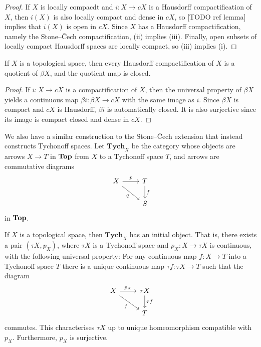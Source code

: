 \documentclass[article, a4paper, 11pt, oneside]{memoir}
\numberwithin{equation}{chapter}
\begin{document}
\begin{proof}
    If $X$ is locally compacdt and $i \colon X \to cX$ is a Hausdorff compactification of $X$, then $i(X)$ is also locally compact and dense in $cX$, so [TODO ref lemma] implies that $i(X)$ is open in $cX$. Since $X$ has a Hausdorff compactification, namely the Stone--\v{C}ech compactification, (ii) implies (iii). Finally, open subsets of locally compact Hausdorff spaces are locally compact, so (iii) implies (i).
\end{proof}


\begin{proposition}
    If $X$ is a topological space, then every Hausdorff compactification of $X$ is a quotient of $\beta X$, and the quotient map is closed.
\end{proposition}

\begin{proof}
    If $i \colon X \to cX$ is a compactification of $X$, then the universal property of $\beta X$ yields a continuous map $\beta i \colon \beta X \to cX$ with the same image as $i$. Since $\beta X$ is compact and $cX$ is Hausdorff, $\beta i$ is automatically closed. It is also surjective since its image is compact closed and dense in $cX$.
\end{proof}


\newcommand{\catTych}{\mathbf{Tych}}

We also have a similar construction to the Stone--\v{C}ech extension that instead constructs Tychonoff spaces. Let $\catTych_X$ be the category whose objects are arrows $X \to T$ in $\mathbf{Top}$ from $X$ to a Tychonoff space $T$, and arrows are commutative diagrams
%
\begin{equation*}
    \begin{tikzcd}
        X
            \ar[r, "p"]
            \ar[dr, "q", swap]
        & T
            \ar[d, "f"]
        \\
        & S
    \end{tikzcd}
\end{equation*}
%
in $\mathbf{Top}$.


\begin{proposition}[Tychonoffication]
    If $X$ is a topological space, then $\catTych_X$ has an initial object. That is, there exists a pair $(\tau X,p_X)$, where $\tau X$ is a Tychonoff space and $p_X \colon X \to \tau X$ is continuous, with the following universal property: For any continuous map $f \colon X \to T$ into a Tychonoff space $T$ there is a unique continuous map $\tau f \colon \tau X \to T$ such that the diagram
    \begin{equation*}
        \begin{tikzcd}
            X
                \ar[r, "p_X"]
                \ar[dr, "f", swap]
            & \tau X
                \ar[d, "\tau f"]
            \\
            & T
        \end{tikzcd}
    \end{equation*}
    commutes. This characterises $\tau X$ up to unique homeomorphism compatible with $p_X$. Furthermore, $p_X$ is surjective.
\end{proposition}
\end{document}
